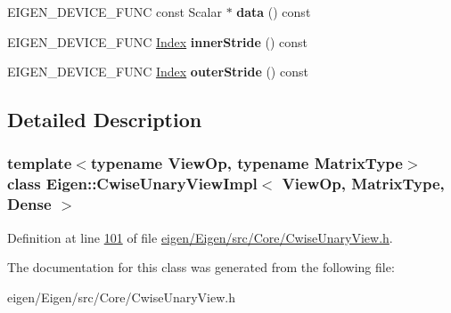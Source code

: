 \begin{DoxyCompactItemize}
E\+I\+G\+E\+N\+\_\+\+D\+E\+V\+I\+C\+E\+\_\+\+F\+U\+NC const Scalar $\ast$ {\bfseries data} () const
\item 
\mbox{\label{class_eigen_1_1_cwise_unary_view_impl_3_01_view_op_00_01_matrix_type_00_01_dense_01_4_a42a1df4ae2e86aa7424753f610c17859}} 
E\+I\+G\+E\+N\+\_\+\+D\+E\+V\+I\+C\+E\+\_\+\+F\+U\+NC \hyperlink{namespace_eigen_a62e77e0933482dafde8fe197d9a2cfde}{Index} {\bfseries inner\+Stride} () const
\item 
\mbox{\label{class_eigen_1_1_cwise_unary_view_impl_3_01_view_op_00_01_matrix_type_00_01_dense_01_4_a21726c36e716d4edac191283a91ea028}} 
E\+I\+G\+E\+N\+\_\+\+D\+E\+V\+I\+C\+E\+\_\+\+F\+U\+NC \hyperlink{namespace_eigen_a62e77e0933482dafde8fe197d9a2cfde}{Index} {\bfseries outer\+Stride} () const
\end{DoxyCompactItemize}


\subsection{Detailed Description}
\subsubsection*{template$<$typename View\+Op, typename Matrix\+Type$>$\newline
class Eigen\+::\+Cwise\+Unary\+View\+Impl$<$ View\+Op, Matrix\+Type, Dense $>$}



Definition at line \hyperlink{eigen_2_eigen_2src_2_core_2_cwise_unary_view_8h_source_l00101}{101} of file \hyperlink{eigen_2_eigen_2src_2_core_2_cwise_unary_view_8h_source}{eigen/\+Eigen/src/\+Core/\+Cwise\+Unary\+View.\+h}.



The documentation for this class was generated from the following file\+:\begin{DoxyCompactItemize}
\item 
eigen/\+Eigen/src/\+Core/\+Cwise\+Unary\+View.\+h\end{DoxyCompactItemize}
